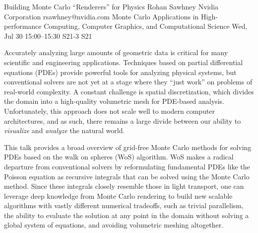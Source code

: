 \documentclass[12pt,lettersize,oneside]{book} %
\begin{document}
\begin{talk}
  {Building Monte Carlo ``Renderers'' for Physics}%
  {Rohan Sawhney}%
  {Nvidia Corporation}%
  {rsawhney@nvidia.com}%
  {Monte Carlo Applications in High-performance Computing, Computer Graphics, and Computational Science}%
  {}%
  {Wed, Jul 30 15:00--15:30}%
  {S21-3}%
  {S21}%
    
   
Accurately analyzing large amounts of geometric data is critical for many scientific and engineering applications. Techniques based on partial differential equations (PDEs) provide powerful tools for analyzing physical systems, but conventional solvers are not yet at a stage where they “just work” on problems of real-world complexity. A constant challenge is spatial discretization, which divides the domain into a high-quality volumetric mesh for PDE-based analysis. Unfortunately, this approach does not scale well to modern computer architectures, and as such, there remains a large divide between our ability to \emph{visualize} and \emph{analyze} the natural world.

This talk provides a broad overview of grid-free Monte Carlo methods for solving PDEs based on the walk on spheres (WoS) algorithm. WoS makes a radical departure from conventional solvers by reformulating fundamental PDEs like the Poisson equation as recursive integrals that can be solved using the Monte Carlo method. Since these integrals closely resemble those in light transport, one can leverage deep knowledge from Monte Carlo rendering to build new scalable algorithms with vastly different numerical tradeoffs, such as trivial parallelism, the ability to
evaluate the solution at any point in the domain without solving a global system
of equations, and avoiding volumetric meshing altogether.



\end{talk}
\end{document}
